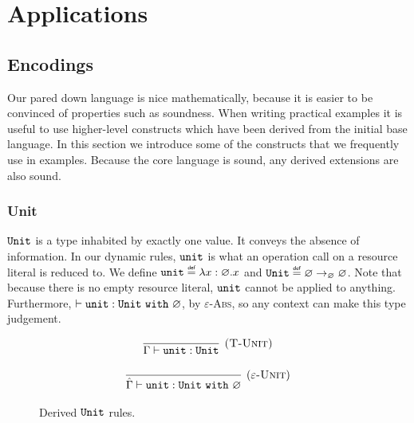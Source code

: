 
\chapter{Applications}

\section{Encodings}

Our pared down language is nice mathematically, because it is easier to be convinced of properties such as soundness. When writing practical examples it is useful to use higher-level constructs which have been derived from the initial base language. In this section we introduce some of the constructs that we frequently use in examples. Because the core language is sound, any derived extensions are also sound.

\subsection{Unit}

$\mathtt{Unit}$ is a type inhabited by exactly one value. It conveys the absence of information. In our dynamic rules, $\mathtt{unit}$ is what an operation call on a resource literal is reduced to. We define $\kwa{unit} \defn \lambda x: \varnothing. x$ and $\kwa{Unit} \defn \varnothing \rightarrow_{\varnothing} \varnothing$. Note that because there is no empty resource literal, $\mathtt{unit}$ cannot be applied to anything. Furthermore, $\vdash \mathtt{unit} : \mathtt{Unit}~\mathtt{with}~ \varnothing$, by \textsc{$\varepsilon$-Abs}, so any context can make this type judgement.



\begin{figure}[h]



\[
\begin{array}{c}

\infer[\textsc{(T-Unit)}]
	{\Gamma \vdash \unit : \Unit}
	{}

\end{array}
\]


\[
\begin{array}{c}

\infer[(\textsc{$\varepsilon$-Unit})]
	{\hat \Gamma \vdash \unit : \Unit~\kw{with} \varnothing}
	{}

\end{array}
\]

	
\caption{Derived $\mathtt{Unit}$ rules.}
\label{This is the label.}
\end{figure}

